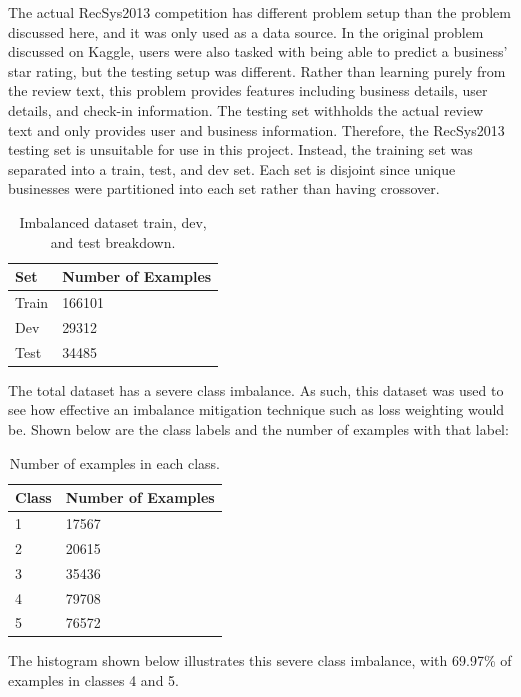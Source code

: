 \par 
The actual RecSys2013 competition has different problem setup than the problem discussed here, and it was only used as a data source. In the original problem discussed on Kaggle, users were also tasked with being able to predict a business' star rating, but the testing setup was different. Rather than learning purely from the review text, this problem provides features including business details, user details, and check-in information. The testing set withholds the actual review text and only provides user and business information. Therefore, the RecSys2013 testing set is unsuitable for use in this project. Instead, the training set was separated into a train, test, and dev set. Each set is disjoint since unique businesses were partitioned into each set rather than having crossover.
\begin{table}[H]
	\begin{tabular}{@{}ll@{}}
		\toprule
		\textbf{Set} & \textbf{Number of Examples} \\ \midrule
		Train        & 166101                      \\
		Dev          & 29312                       \\
		Test         & 34485                       \\ \bottomrule
	\end{tabular}
\caption{Imbalanced dataset train, dev, and test breakdown.}
\end{table}

The total dataset has a severe class imbalance. As such, this dataset was used to see how effective an imbalance mitigation technique such as loss weighting would be. Shown below are the class labels and the number of examples with that label:
\begin{table}[H]
	\begin{tabular}{ll}
		\hline
		\textbf{Class} & \textbf{Number of Examples} \\ \hline
		1              & 17567                       \\
		2              & 20615                       \\
		3              & 35436                       \\
		4              & 79708                       \\
		5              & 76572                      
	\end{tabular}
\caption{Number of examples in each class.}
\end{table}
The histogram shown below illustrates this severe class imbalance, with 69.97\% of examples in classes 4 and 5.


